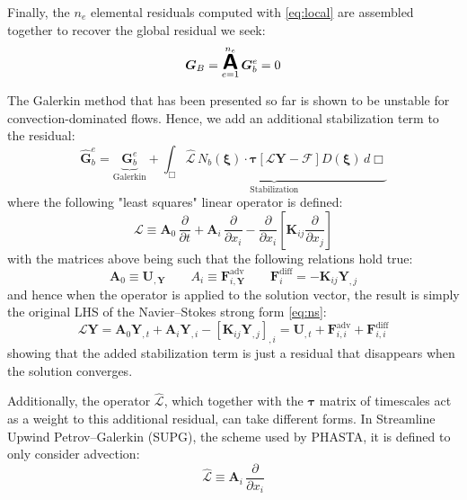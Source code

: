 \documentclass{ucb}
\begin{document}
Finally, the $n_e$ elemental residuals computed with \eqref{eq:local} are assembled together to recover the global residual we seek:
\begin{equation}
    \bm{G}_B = \Assembly_{e=1}^{n_e} \bm{G}_b^e = 0
\end{equation}

The Galerkin method that has been presented so far is shown to be unstable for convection-dominated flows. Hence, we add an additional stabilization term to the residual:
\begin{equation}
    \bm{\hat{G}}_b^e = \underbrace{\bm{G}_b^e}_{\text{Galerkin}} + \underbrace{\int_\Box \hat{\mathcal{L}}\,N_b(\bm{\xi}) \cdot \bm{\tau}\left[\mathcal{L}\bm{Y} - \bm{\mathcal{F}}\right] D(\bm{\xi}) \, d\Box}_{\text{Stabilization}}
\end{equation}
where the following "least squares" linear operator is defined:
\begin{equation}
    \mathcal{L} \equiv \bm{A}_0\,\frac{\partial}{\partial t} + \bm{A}_i\,\frac{\partial}{\partial x_i} - \frac{\partial}{\partial x_i}\left[\bm{K}_{ij}\frac{\partial}{\partial x_j}\right]
\end{equation}
with the matrices above being such that the following relations hold true:
\begin{equation}
    \bm{A}_0 \equiv \bm{U}_{,\bm{Y}} \qquad {A}_i \equiv \bm{F}_{i,\bm{Y}}^\mathrm{adv} \qquad \bm{F}_i^\mathrm{diff} = -\bm{K}_{ij} \bm{Y}_{,j}
\end{equation}
and hence when the operator is applied to the solution vector, the result is simply the original LHS of the Navier--Stokes strong form \eqref{eq:ns}:
\begin{equation}
    \mathcal{L}\bm{Y} = \bm{A}_0\bm{Y}_{,t} + \bm{A}_i\bm{Y}_{,i} - \left[\bm{K}_{ij} \bm{Y}_{,j}\right]_{,i} = \bm{U}_{,t} + \bm{F}_{i,i}^\mathrm{adv} + \bm{F}_{i,i}^\mathrm{diff}
\end{equation}
showing that the added stabilization term is just a residual that disappears when the solution converges.

Additionally, the operator $\hat{\mathcal{L}}$, which together with the $\bm{\tau}$ matrix of timescales act as a weight to this additional residual, can take different forms. In Streamline Upwind Petrov--Galerkin (SUPG), the scheme used by PHASTA, it is defined to only consider advection:
\begin{equation}
    \hat{\mathcal{L}} \equiv \bm{A}_{i}\,\frac{\partial}{\partial x_i}
\end{equation}
\end{document}
